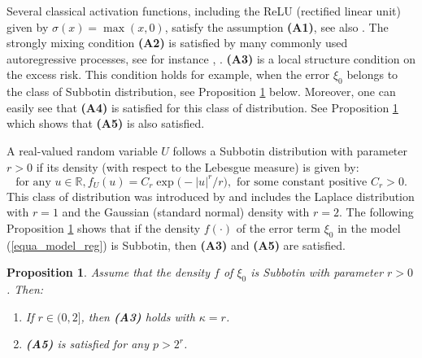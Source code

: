 \documentclass[10pt,twoside]{article}
\numberwithin{equation}{section}
\newtheorem{prop}[thm]{Proposition}
\newcommand{\R}{\ensuremath{\mathbb{R}}}
\begin{document}
\noindent
Several classical activation functions, including the  ReLU (rectified linear unit) given by $\sigma(x) = \max(x,0)$, satisfy the assumption \textbf{(A1)}, see also \cite{kengne2025excess}.
%
The strongly mixing condition \textbf{(A2)} is satisfied by many commonly used autoregressive processes, see for instance \cite{chen2000geometric}, \cite{doukhan1994mixing}.
\textbf{(A3)} is a local structure condition on the excess risk. This condition holds for example, when the error $\xi_0$ belongs to the class of Subbotin distribution, see Proposition \ref{equa_bound_assumpA5} below.
%
Moreover, one can easily see that \textbf{(A4)} is satisfied for this class of distribution.  
%
See Proposition \ref{equa_bound_assumpA5} which shows that \textbf{(A5)} is also satisfied.

\medskip

A real-valued random variable $U$ follows a Subbotin distribution with parameter $r >0$ if its density (with respect to the Lebesgue measure) is given by:
%
\begin{equation}\label{def_Subbotin}
\text{for any } u\in \R, f_U(u) = C_r \exp \big(-|u|^r/r \big), \text{ for some constant positive } C_r > 0.
\end{equation}
%
This class of distribution was introduced by \cite{subbotin1923law} and includes the Laplace distribution with $r= 1$ and the Gaussian (standard normal) density with $r= 2$.
%
The following Proposition \ref{equa_bound_assumpA5} shows that if the density $f(\cdot)$ of the error term $\xi_0$ in the model (\ref{equa_model_reg}) is Subbotin, then \textbf{(A3)} and \textbf{(A5)} are satisfied. 
%
%
\begin{prop}\label{equa_bound_assumpA5}
    Assume that the density $f$ of $\xi_0$ is Subbotin with parameter $r >0$. Then:
  \begin{enumerate}
  \item If $r \in (0,2]$, then \textbf{(A3)} holds with $\kappa = r$.
  \item \textbf{(A5)} is satisfied for any $p > 2^r$.
  \end{enumerate}
\end{prop}


%
%
\end{document}
